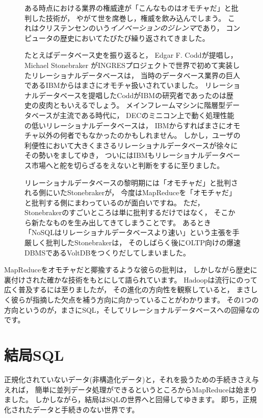 \begin{figure}[t]
\begin{screen}
 \vspace*{3mm}

 ある時点における業界の権威達が「こんなものはオモチャだ」と批判した技術が，
 やがて世を席巻し，権威を飲み込んでしまう。
 これはクリステンセンのいう{\em イノベーションのジレンマ}であり，
 コンピュータの歴史においてたびたび繰り返されてきました。

 たとえばデータベース史を振り返ると，
 Edgar F. Coddが提唱し，
 Michael Stonebraker がINGRESプロジェクトで世界で初めて実装したリレーショナルデータベースは，
 当時のデータベース業界の巨人であるIBMからはまさにオモチャ扱いされていました。
 リレーショナルデータベースを提唱したCoddがIBMの研究者であったのは歴史の皮肉ともいえるでしょう。
 メインフレームマシンに階層型データベースが主流である時代に，
 DECのミニコン上で動く処理性能の低いリレーショナルデータベースは，
 IBMからすればまさにオモチャ以外の何者でもなかったのかもしれません。
 しかし，ユーザの利便性において大きくまさるリレーショナルデータベースが徐々にその勢いをましてゆき，
 ついにはIBMもリレーショナルデータベース市場へと舵を切らざるをえないと判断をするに至りました。

 リレーショナルデータベースの黎明期には「オモチャだ」と批判される側にいたStonebrakerが，
 今度はMapReduceを「オモチャだ」と批判する側にまわっているのが面白いですね。
 ただ，Stonebrakerのすごいところは単に批判するだけではなく，
 そこから新たなものを生み出してきてしまうことです。
 あるとき「NoSQLはリレーショナルデータベースより速い」という主張を手厳しく批判したStonebrakerは，
 そのしばらく後にOLTP向けの爆速DBMSであるVoltDBをつくりだしてしまいました。
\end{screen}
\end{figure}

MapReduceをオモチャだと揶揄するような彼らの批判は，
しかしながら歴史に裏付けされた確かな技術をもとにして語られています。
Hadoopは流行にのって広く普及するには至りましたが，
その進化の方向性を観察していると，
まさしく彼らが指摘した欠点を補う方向に向かっていることがわかります。
その1つの方向というのが，まさにSQL，そしてリレーショナルデータベースへの回帰なのです。

\section{結局SQL}

正規化されていないデータ(非構造化データ)と，それを扱うための手続きさえ与えれば，
簡単に並列データ処理ができるというところからMapReduceは始まりました。
しかしながら，結局はSQLの世界へと回帰してゆきます。
即ち，正規化されたデータと手続きのない世界です。

